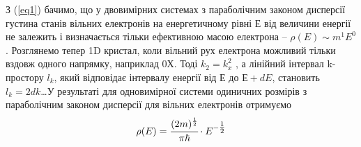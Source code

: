 \documentclass[a4paper,14pt]{extreport}
\begin{document}
{    З (\ref{eq1}) бачимо, що у двовимірних системах з параболічним законом дисперсії густина станів вільних електронів на енергетичному рівні $Е$ від величини енергії не залежить і визначається тільки ефективною масою електрона – $\rho(E)\sim m^1 E^0$.
    Розглянемо тепер 1D кристал, коли вільний рух
    електрона можливий тільки вздовж одного напрямку, наприклад $0Х$. Тоді $k_2 = k_x^2$ , а лінійний інтервал k-простору $l_k$, який відповідає
    інтервалу енергії від Е до $Е+dE$, становить $l_k=2dk$\dots У результаті для одновимірної системи одиничних розмірів з параболічним законом дисперсії для вільних електронів отримуємо \begin{equation}
    \rho(E)=\cfrac{(2m)^{\frac12}}{\pi \hbar}\cdot E^{-\tfrac{1}{2}}
    \end{equation}
    }
\end{document}
